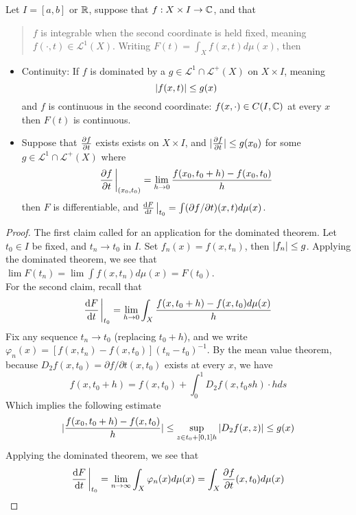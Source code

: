 \documentclass[../../main.tex]{subfiles}
\begin{document}
\begin{wts}
    Let $I = [a,b]$ or $\mathbb{R}$, suppose that $f: X\times I\to {\mathbb{C}}$, and that 
    \begin{quote}
        $f$ is integrable when the second coordinate is held fixed, meaning $f(\cdot,t)\in \mathcal{L}^1(X)$. Writing $F(t) = \int_X f(x,t)d\mu(x)$, then
    \end{quote}
    \begin{itemize}
        \item Continuity: If $f$ is dominated by a $g\in \mathcal{L}^1\cap \mathcal{L}^+(X)$ on $X\times I$, meaning
        \[
            \vert {f(x,t)} \vert\leq g(x)
        \]
        and $f$ is continuous in the second coordinate: $f(x,\cdot)\in C(I,{\mathbb{C}})$ at every $x$ then $F(t)$ is continuous.
        \item Suppose that $\pdv{f}{t}$ exists exists on $X\times I$, and $\vert {\pdv{f}{t}(x_0,t_0)} \vert\leq g(x_0)$ for some $g\in \mathcal{L}^1\cap \mathcal{L}^+(X)$ where 
        \begin{equation}
            \pdv{f}{t}\eval_{(x_0,t_0)} = \lim_{h\to 0}\frac{f(x_0,t_0 + h) - f(x_0, t_0)}{h}
        \label{thm:2.27 partial derivative}
        \end{equation}
        then $F$ is differentiable, and $\dv{F}{t}\eval_{t_0} = \int (\partial f/\partial t)(x,t)d\mu(x)$.
    \end{itemize}
\end{wts}
\begin{proof}
    The first claim called for an application for the dominated theorem. Let $t_0\in I$ be fixed, and $t_n\to t_0$ in $I$. Set $f_n(x) = f(x,t_n)$, then $\vert {f_n} \vert\leq g$. Applying the dominated theorem, we see that $\lim F(t_n) = \lim \int f(x,t_n)d\mu(x) = F(t_0)$.\\

    For the second claim, recall that 
    \[
        \dv{F}{t}\eval_{t_0} = \lim_{h\to 0}\int_X \frac{f(x,t_0 + h) - f(x, t_0)d\mu(x)}{h}
    \]
    Fix any sequence $t_n \to t_0$ (replacing $t_0 + h$), and we write $\varphi_n(x) = [f(x,t_n) - f(x,t_0)](t_n - t_0)^{-1}$. By the mean value theorem, because $D_2 f(x, t_0) = \partial f/\partial t(x,t_0)$ exists at every $x$, we have
    \[
        f(x, t_0 + h) = f(x, t_0) + \int_0^1 D_2 f(x, t_0 sh)\cdot h ds
    \]
    Which implies the following estimate
    \[
        \vert {\frac{f(x_0, t_0 + h) - f(x, t_0)}{h}} \vert\leq \sup_{z\in t_0 + [0,1]h}\vert {D_2 f(x, z)} \vert\leq g(x)
    \]
    Applying the dominated theorem, we see that 
    \[
        \dv{F}{t}\eval_{t_0}=\lim_{n\to\infty}\int_X \varphi_n(x) d\mu(x) = \int_X \pdv{f}{t}(x,t_0)(x,t_0)d\mu(x)
    \]
\end{proof}

\begin{corollary}
    
\end{corollary}
\end{document}
